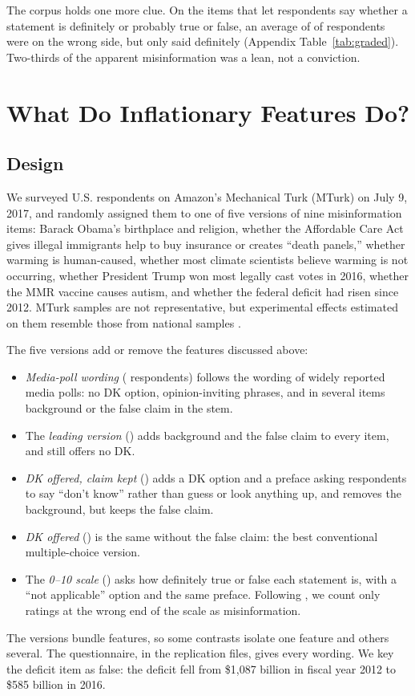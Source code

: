 \documentclass[11pt]{article}
\begin{document}
The corpus holds one more clue. On the \nGraded{} items that let respondents say whether a statement is definitely or probably true or false, an average of \gradedIncorrect{} of respondents were on the wrong side, but only \gradedConfident{} said definitely (Appendix Table~\ref{tab:graded}). Two-thirds of the apparent misinformation was a lean, not a conviction.

\section{What Do Inflationary Features Do?}

\subsection{Design}

We surveyed \nJuly{} U.S. respondents on Amazon's Mechanical Turk (MTurk) on July 9, 2017, and randomly assigned them to one of five versions of nine misinformation items: Barack Obama's birthplace and religion, whether the Affordable Care Act gives illegal immigrants help to buy insurance or creates ``death panels,'' whether warming is human-caused, whether most climate scientists believe warming is not occurring, whether President Trump won most legally cast votes in 2016, whether the MMR vaccine causes autism, and whether the federal deficit had risen since 2012. MTurk samples are not representative, but experimental effects estimated on them resemble those from national samples \citep{berinsky2012, huff2015, mullinix2015}.

The five versions add or remove the features discussed above:
\begin{itemize}
\item \emph{Media-poll wording} (\nMedia{} respondents) follows the wording of widely reported media polls: no DK option, opinion-inviting phrases, and in several items background or the false claim in the stem.
\item The \emph{leading version} (\nPyrite{}) adds background and the false claim to every item, and still offers no DK.
\item \emph{DK offered, claim kept} (\nFewer{}) adds a DK option and a preface asking respondents to say ``don't know'' rather than guess or look anything up, and removes the background, but keeps the false claim.
\item \emph{DK offered} (\nDkOffered{}) is the same without the false claim: the best conventional multiple-choice version.
\item The \emph{0--10 scale} (\nScale{}) asks how definitely true or false each statement is, with a ``not applicable'' option and the same preface. Following \citet{luskin2026}, we count only ratings at the wrong end of the scale as misinformation.
\end{itemize}
The versions bundle features, so some contrasts isolate one feature and others several. The questionnaire, in the replication files, gives every wording. We key the deficit item as false: the deficit fell from \$1,087 billion in fiscal year 2012 to \$585 billion in 2016.
\end{document}
